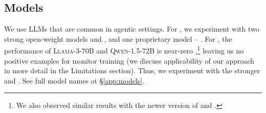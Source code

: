 \subsection{Models}
We use LLMs that are common in agentic settings.
For \ourenv{}, we experiment with two strong open-weight models \llama{} \cite{grattafiori2024llama3herdmodels} and \qwen{} \cite{qwen2025qwen25technicalreport}, and one proprietary model -- \gpt{} \cite{openai2024gpt4technicalreport}.
For \govsim{}, the performance of \textsc{Llama-3-70B} and \textsc{Qwen-1.5-72B} is near-zero \cite{piatti2024cooperate},\footnote{We also observed similar results with the newer version of \llama{} and \qwen{}.} leaving us no positive examples for monitor training (we discuss applicability of our approach in more detail in the Limitations section). Thus, we experiment with the stronger \qwenlarge{} \cite{bai2023qwentechnicalreport} and \gpt{}. See full model names at \S\ref{app:models}.



